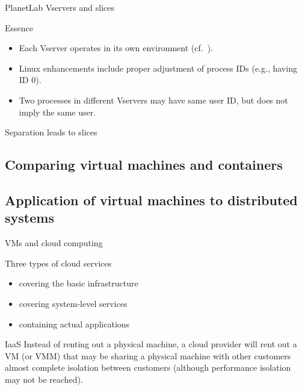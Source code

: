   \begin{slide}{PlanetLab Vservers and slices}
    \begin{block}{Essence}
      \begin{itemize}\tightlist
      \item Each Vserver operates in its own environment (cf.\ ). 
      \item Linux enhancements include proper adjustment of process IDs (e.g.,  having ID 0). 
      \item Two processes in different Vservers may have same user ID, but does not imply the same user.
      \end{itemize}
    \end{block}
    \begin{block}{Separation leads to slices}
      \begin{center}
      \end{center}
    \end{block}
  \end{slide}
\subsection{Comparing virtual machines and containers}
\subsection{Application of virtual machines to distributed systems}
\begin{slide}{VMs and cloud computing}
  \begin{block}{Three types of cloud services}
    \begin{itemize}\tightlist
    \item {} covering the basic infrastructure
    \item {} covering system-level services
    \item {} containing actual applications
    \end{itemize}
  \end{block}
  \begin{alertblock}{IaaS}
    Instead of renting out a physical machine, a cloud provider will rent out a VM (or VMM) that may be
    sharing a physical machine with other customers \mathexpr{\Rightarrow} almost complete isolation between
    customers (although performance isolation may not be reached).
  \end{alertblock}
\end{slide}
